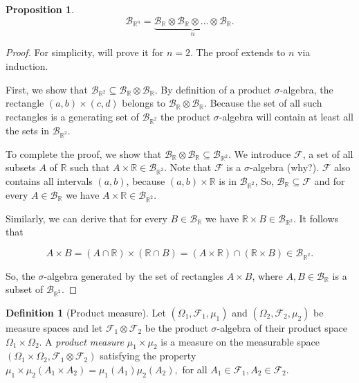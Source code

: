 \documentclass{book}
\theoremstyle{plain}%
\newtheorem{proposition}{Proposition}[section]
\theoremstyle{definition}
\newtheorem{definition}{Definition}[section]
\begin{document}
\begin{proposition}
$$\mathcal{B}_{\mathbb{R}^n} = \underbrace{\mathcal{B}_\mathbb{R} \otimes \mathcal{B}_\mathbb{R} \otimes \hdots \otimes \mathcal{B}_\mathbb{R}}_n.$$
\end{proposition}

\begin{proof}
For simplicity, will prove it for $n = 2$. The proof extends to $n$ via induction.

First, we show that $\mathcal{B}_{\mathbb{R}^2} \subseteq \mathcal{B}_\mathbb{R} \otimes \mathcal{B}_\mathbb{R}$. By definition of a product $\sigma$-algebra, the rectangle $(a,b) \times (c, d)$ belongs to $\mathcal{B}_\mathbb{R} \otimes \mathcal{B}_\mathbb{R}$. Because the set of all such rectangles is a generating set of $\mathcal{B}_{\mathbb{R}^2}$ the product $\sigma$-algebra will contain at least all the sets in $\mathcal{B}_{\mathbb{R}^2}$.

To complete the proof, we show that $\mathcal{B}_\mathbb{R} \otimes \mathcal{B}_\mathbb{R} \subseteq \mathcal{B}_{\mathbb{R}^2}$. We introduce $\mathcal{F}$, a set of all subsets $A$ of $\mathbb{R}$ such that $A \times \mathbb{R} \in \mathcal{B}_{\mathbb{R}^2}$. Note that $\mathcal{F}$ is a $\sigma$-algebra (why?). $\mathcal{F}$ also contains all intervals $(a, b)$, because $(a, b) \times \mathbb{R}$ is in $\mathcal{B}_{\mathbb{R}^2}$, So, $\mathcal{B}_\mathbb{R} \subseteq \mathcal{F}$ and for every $A \in \mathcal{B}_\mathbb{R}$ we have $A \times \mathbb{R} \in \mathcal{B}_{\mathbb{R}^2}$.

Similarly, we can derive that for every $B \in \mathcal{B}_\mathbb{R}$ we have $\mathbb{R}  \times B\in \mathcal{B}_{\mathbb{R}^2}$. It follows that

$$A \times B = (A \cap \mathbb{R}) \times (\mathbb{R} \cap B) = (A \times \mathbb{R}) \cap (\mathbb{R} \times B) \in \mathcal{B}_{\mathbb{R}^2}.$$

So, the $\sigma$-algebra generated by the set of rectangles $A \times B$, where $A, B \in \mathcal{B}_\mathbb{R}$ is a subset of $\mathcal{B}_{\mathbb{R}^2}$.
\end{proof}

\begin{definition}[Product measure] Let $(\Omega_1, \mathcal{F}_1, \mu_1)$ and $(\Omega_2, \mathcal{F}_2, \mu_2)$ be measure spaces and let $\mathcal{F}_1 \otimes \mathcal{F}_2$ be the product $\sigma$-algebra of their product space $\Omega_1 \times \Omega_2$. A \emph{product measure} $\mu_1 \times \mu_2$ is a measure on the measurable space $(\Omega_1 \times \Omega_2, \mathcal{F}_1 \otimes \mathcal{F}_2)$ satisfying the property $\mu_1 \times \mu_2(A_1 \times A_2) = \mu_1(A_1)\mu_2(A_2),$ for all $A_1 \in \mathcal{F}_1, A_2 \in \mathcal{F}_2$.
\end{definition}
\end{document}
